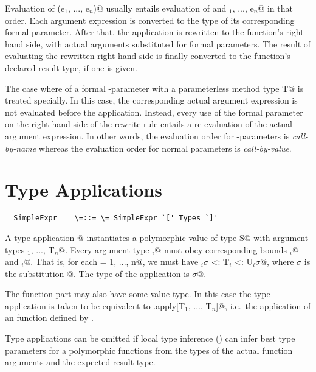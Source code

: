 \documentclass[11pt]{report}
\begin{document}

Evaluation of \verb@f(e$_1$, ..., e$_n$)@ usually entails evaluation of
\verb@f@ and \verb@e$_1$, ..., e$_n$@ in that order. Each argument expression
is converted to the type of its corresponding formal parameter.  After
that, the application is rewritten to the function's right hand side,
with actual arguments substituted for formal parameters.  The result
of evaluating the rewritten right-hand side is finally converted to
the function's declared result type, if one is given.

The case where of a formal \verb@def@-parameter with a parameterless
method type \verb@[]T@ is treated specially. In this case, the
corresponding actual argument expression is not evaluated before the
application. Instead, every use of the formal parameter on the
right-hand side of the rewrite rule entails a re-evaluation of the
actual argument expression. In other words, the evaluation order for
\verb@def@-parameters is {\em call-by-name} whereas the evaluation
order for normal parameters is {\em call-by-value}.

\section{Type Applications}
\label{sec:type-app}
\syntax\begin{verbatim}
  SimpleExpr    \=::= \= SimpleExpr `[' Types `]'
\end{verbatim}

A type application \verb@f[T$_1$, ..., T$_n$]@ instantiates a
polymorphic value \verb@f@ of type
\verb@[a$_1$ >: L$_1$ <: U$_1$, ..., a$_n$ >: L$_n$ <: U$_n$]S@ with
argument types \verb@T$_1$, ..., T$_n$@.  Every argument type
\verb@T$_i$@ must obey corresponding bounds \verb@L$_i$@ and
\verb@U$_i$@.  That is, for each \verb@i = 1, ..., n@, we must
have \verb@L$_i \sigma$ <: T$_i$ <: U$_i \sigma$@, where $\sigma$ is the
substitution \verb@[a$_1$ := T$_1$, ..., a$_n$ := T$_n$]@.  The type
of the application is \verb@S$\sigma$@.  

The function part \verb@f@ may also have some value type. In this case
the type application is taken to be equivalent to
\verb@f.apply[T$_1$, ..., T$_n$]@, i.e.\ the
application of an \verb@apply@ function defined by \verb@f@.

Type applications can be omitted if local type inference
() can infer best type parameters for a
polymorphic functions from the types of the actual function arguments
and the expected result type.
\end{document}
